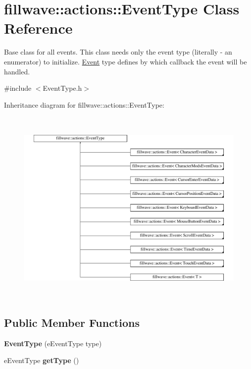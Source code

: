 \hypertarget{classfillwave_1_1actions_1_1EventType}{}\section{fillwave\+:\+:actions\+:\+:Event\+Type Class Reference}
\label{classfillwave_1_1actions_1_1EventType}


Base class for all events. This class needs only the event type (literally -\/ an enumerator) to initialize. \hyperlink{classfillwave_1_1actions_1_1Event}{Event} type defines by which callback the event will be handled.  




{\ttfamily \#include $<$Event\+Type.\+h$>$}

Inheritance diagram for fillwave\+:\+:actions\+:\+:Event\+Type\+:\begin{figure}[H]
\begin{center}
\leavevmode
\includegraphics[height=9.716088cm]{classfillwave_1_1actions_1_1EventType}
\end{center}
\end{figure}
\subsection*{Public Member Functions}
\begin{DoxyCompactItemize}
\item 
\hypertarget{classfillwave_1_1actions_1_1EventType_a221bb02b1f5c6e04695707ba47abd61b}{}{\bfseries Event\+Type} (e\+Event\+Type type)\label{classfillwave_1_1actions_1_1EventType_a221bb02b1f5c6e04695707ba47abd61b}

\item 
\hypertarget{classfillwave_1_1actions_1_1EventType_adf6612d2c6a3edd17f1cdd313355d62c}{}e\+Event\+Type {\bfseries get\+Type} ()\label{classfillwave_1_1actions_1_1EventType_adf6612d2c6a3edd17f1cdd313355d62c}

\end{DoxyCompactItemize}


